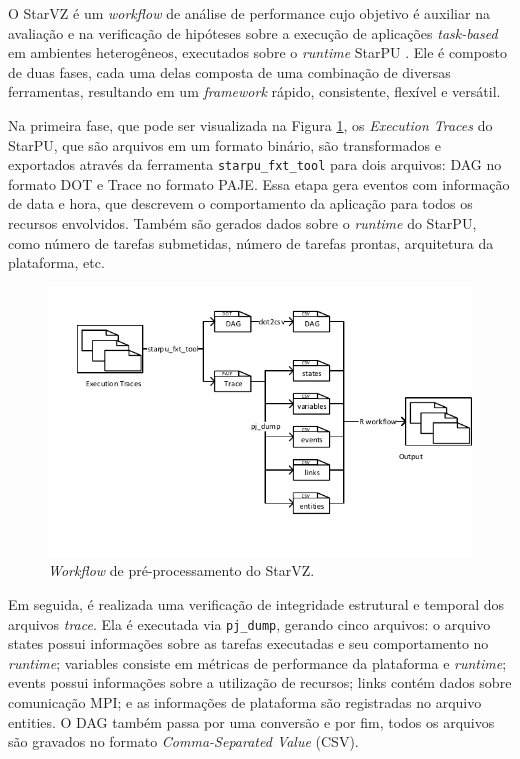 O StarVZ \cite{ref:starvz} é um \emph{workflow} de análise de performance cujo 
objetivo é auxiliar na avaliação e na verificação de hipóteses sobre a execução de 
aplicações \emph{task-based} em ambientes heterogêneos, executados sobre o
\emph{runtime} StarPU \cite{ref:starpu}. Ele é composto de duas fases, cada uma 
delas composta de uma combinação de diversas ferramentas, resultando em um \emph{framework}
rápido, consistente, flexível e versátil.

Na primeira fase, que pode ser visualizada na Figura \ref{fig:starvz-workflow1}, os 
\emph{Execution Traces} do StarPU, que são arquivos em um formato binário, são transformados
e exportados através da ferramenta \texttt{starpu\_fxt\_tool} para dois arquivos: DAG no formato DOT 
e Trace no formato PAJE. Essa etapa gera eventos com informação de data e hora, que 
descrevem o comportamento da aplicação para todos os recursos envolvidos. Também são gerados 
dados sobre o \emph{runtime} do StarPU, como número de tarefas submetidas,
número de tarefas prontas, arquitetura da plataforma, etc.

\begin{figure}[ht]
 \centerline{\includegraphics[width=1\textwidth]{./img/step1-final.pdf}}
 \caption{\emph{Workflow} de pré-processamento do StarVZ.}
 \label{fig:starvz-workflow1}
\end{figure}

Em seguida, é realizada uma verificação de integridade estrutural e temporal dos
arquivos \emph{trace}. Ela é executada via \texttt{pj\_dump}, gerando cinco arquivos: o arquivo states 
possui informações sobre as tarefas executadas e seu comportamento no \emph{runtime}; variables
consiste em métricas de performance da plataforma e \emph{runtime}; events possui informações sobre a 
utilização de recursos; links contém dados sobre comunicação MPI; e as informações de plataforma 
são registradas no arquivo entities. O DAG também passa por uma conversão e por fim, todos os 
arquivos são gravados no formato \emph{Comma-Separated Value} (CSV).

